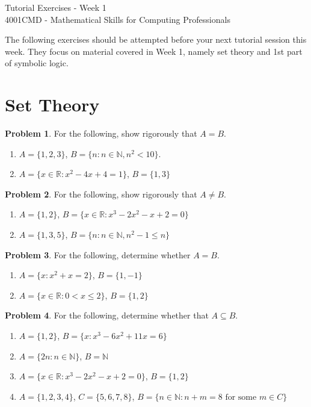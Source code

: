 \documentclass[a4paper,12pt]{article}
\numberwithin{equation}{section}
\theoremstyle{plain}
\theoremstyle{definition}
\newtheorem{problem}{Problem}
\newcommand{\N}{\mathbb N}
\newcommand{\R}{\mathbb R}
\begin{document}
\begin{center}
\Large{Tutorial Exercises - Week 1} \\
\vspace{3mm}
\large{4001CMD - Mathematical Skills for Computing Professionals} \\
\vspace{5mm}
\end{center}

\noindent The following exercises should be attempted before your next tutorial session this week. They focus on material covered in Week 1, namely set theory and 1st part of symbolic logic. 

\section*{Set Theory}

\begin{problem}
	For the following, show rigorously that $A = B$. 
	\begin{enumerate}[label=(\alph*)]
		\item $A = \{1,2,3\}$, $B = \{n : n \in \N, n^2 < 10\}$. 
		\item $A = \{x \in \R: x^2 - 4x + 4 = 1\}$, $B = \{1,3\}$
	\end{enumerate}
\end{problem}

\begin{problem}
	For the following, show rigorously that $A \neq B$. 
	\begin{enumerate}[label=(\alph*)]
		\item $A = \{1,2\}$, $B=\{x \in \R : x^3 - 2x^2 - x + 2 = 0\}$
		\item $A = \{1,3,5\}$, $B = \{n : n \in \N, n^2 - 1 \leq n\}$
	\end{enumerate}
\end{problem}

\begin{problem}
	For the following, determine whether $A = B$. 
	\begin{enumerate}[label=(\alph*)]
		\item $A = \{x : x^2 + x = 2\}$, $B = \{1,-1\}$
		\item $A = \{x \in \R : 0 < x \leq 2\}$, $B = \{1,2\}$
	\end{enumerate}
\end{problem}

\begin{problem}
	For the following, determine whether that $A \subseteq B$. 
	\begin{enumerate}[label=(\alph*)]
		\item $A = \{1,2\}$, $B = \{x : x^3 - 6x^2 + 11x = 6\}$
		\item $A = \{2n : n \in \N\}$, $B = \N$
		\item $A = \{x \in \R : x^3 - 2x^2 - x + 2 = 0\}$, $B =\{1,2\}$
		\item $A = \{1,2,3,4\}$, $C = \{5,6,7,8\}$, $B = \{n \in \N : n+m = 8 \textrm{ for some } m \in C\}$
	\end{enumerate} 
\end{problem}
\end{document}
